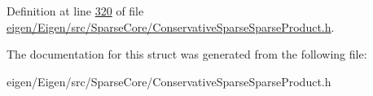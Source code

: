 Definition at line \hyperlink{eigen_2_eigen_2src_2_sparse_core_2_conservative_sparse_sparse_product_8h_source_l00320}{320} of file \hyperlink{eigen_2_eigen_2src_2_sparse_core_2_conservative_sparse_sparse_product_8h_source}{eigen/\+Eigen/src/\+Sparse\+Core/\+Conservative\+Sparse\+Sparse\+Product.\+h}.



The documentation for this struct was generated from the following file\+:\begin{DoxyCompactItemize}
\item 
eigen/\+Eigen/src/\+Sparse\+Core/\+Conservative\+Sparse\+Sparse\+Product.\+h\end{DoxyCompactItemize}
